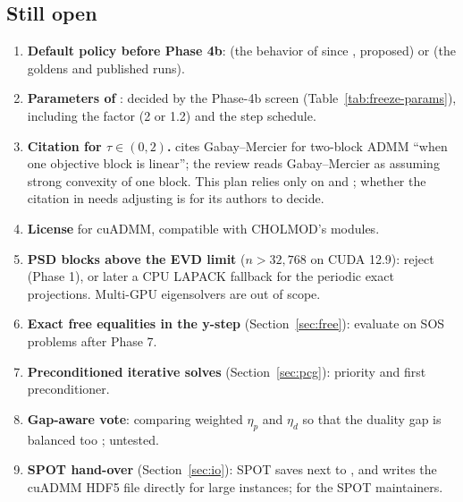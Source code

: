 \documentclass[11pt]{article}
\begin{document}
\subsection{Still open}
\begin{enumerate}[label=\textbf{O\arabic*.}]
  \item \textbf{Default policy before Phase 4b}:  (the behavior of 
  since , proposed) or  (the goldens and published runs).
  \item \textbf{Parameters of }: decided by the Phase-4b screen
  (Table~\ref{tab:freeze-params}), including the factor (2 or 1.2) and the step schedule.
  \item \textbf{Citation for $\tau\in(0,2)$.} \cite{afterimage} cites Gabay--Mercier for two-block ADMM ``when one
  objective block is linear''; the review reads Gabay--Mercier as assuming strong convexity of one block. This
  plan relies only on \cite{afterimage} and \cite{chen2021}; whether the citation in \cite{afterimage} needs
  adjusting is for its authors to decide.
  \item \textbf{License} for cuADMM, compatible with CHOLMOD's modules.
  \item \textbf{PSD blocks above the EVD limit} ($n>32{,}768$ on CUDA 12.9): reject (Phase 1), or later a CPU
  LAPACK fallback for the periodic exact projections. Multi-GPU eigensolvers are out of scope.
  \item \textbf{Exact free equalities in the y-step} (Section~\ref{sec:free}): evaluate on SOS problems after
  Phase 7.
  \item \textbf{Preconditioned iterative solves} (Section~\ref{sec:pcg}): priority and first preconditioner.
  \item \textbf{Gap-aware vote}: comparing weighted $\eta_p$ and $\eta_d$ so that the duality gap is balanced too
  \cite{sigmastudy}; untested.
  \item \textbf{SPOT hand-over} (Section~\ref{sec:io}): SPOT saves  next to , and writes the
  cuADMM HDF5 file directly for large instances; for the SPOT maintainers.
\end{enumerate}

\appendix
\end{document}
